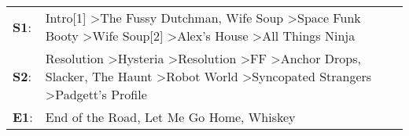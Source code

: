 \begin{supertabular}{p{0.03\textwidth}p{0.92\textwidth}}
 \textbf{S1}:  &                                                                                                                                Intro[1]\textsuperscript{} \textgreater \enspace The Fussy Dutchman\textsuperscript{}, \enspace Wife Soup\textsuperscript{} \textgreater \enspace Space Funk Booty\textsuperscript{} \textgreater \enspace Wife Soup[2]\textsuperscript{} \textgreater \enspace Alex's House\textsuperscript{} \textgreater \enspace All Things Ninja\textsuperscript{}  \enspace  \\
 \textbf{S2}:  &  Resolution\textsuperscript{} \textgreater \enspace Hysteria\textsuperscript{} \textgreater \enspace Resolution\textsuperscript{} \textgreater \enspace FF\textsuperscript{} \textgreater \enspace Anchor Drops\textsuperscript{}, \enspace Slacker\textsuperscript{}, \enspace The Haunt\textsuperscript{} \textgreater \enspace Robot World\textsuperscript{} \textgreater \enspace Syncopated Strangers\textsuperscript{} \textgreater \enspace Padgett's Profile\textsuperscript{}  \enspace  \\
 \textbf{E1}:  &                                                                                                                                                                                                                                                                                                                                                                                                  End of the Road\textsuperscript{}, \enspace Let Me Go Home, Whiskey\textsuperscript{}  \enspace  \\
\end{supertabular}
